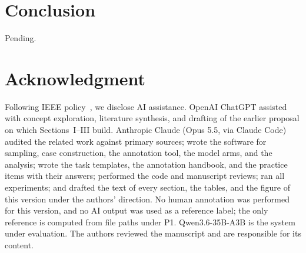 \section{Conclusion}\label{sec:conclusion}
\ifresults\else Pending.\fi

\section*{Acknowledgment}
Following IEEE policy~\cite{ieeeai}, we disclose AI assistance. OpenAI ChatGPT assisted with concept exploration,
literature synthesis, and drafting of the earlier proposal on which Sections~I--III build. Anthropic Claude (Opus 5.5,
via Claude Code) audited the related work against primary sources; wrote the software for sampling, case construction,
the annotation tool, the model arms, and the analysis; wrote the task templates, the annotation handbook, and the
practice items with their answers; performed the code and manuscript reviews; ran all experiments; and drafted the text
of every section, the tables, and the figure of this version under the authors' direction. No human annotation was performed for this
version, and no AI output was used as a reference label; the only reference is computed from file paths under P1.
Qwen3.6-35B-A3B is the system under evaluation. The authors reviewed the manuscript and are responsible for its content.



